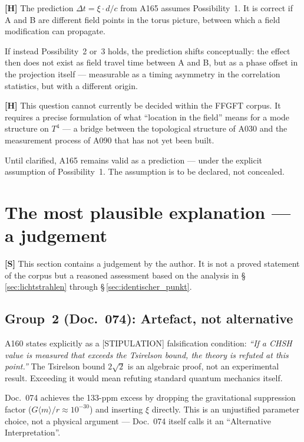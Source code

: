\textbf{[H]} The prediction $\Delta t = \xi \cdot d/c$ from A165
assumes Possibility~1. It is correct if A and B are different field
points in the torus picture, between which a field modification can
propagate.

If instead Possibility~2 or~3 holds, the prediction shifts
conceptually: the effect then does not exist as field travel time
between A and B, but as a phase offset in the projection itself ---
measurable as a timing asymmetry in the correlation statistics, but
with a different origin.

\textbf{[H]} This question cannot currently be decided within the
FFGFT corpus. It requires a precise formulation of what ``location
in the field'' means for a mode structure on $T^4$ --- a bridge
between the topological structure of A030 and the measurement process
of A090 that has not yet been built.

Until clarified, A165 remains valid as a prediction --- under the
explicit assumption of Possibility~1. The assumption is to be
declared, not concealed.

\section{The most plausible explanation --- a judgement}
\label{sec:urteil}

\textbf{[S]} This section contains a judgement by the author. It is not
a proved statement of the corpus but a reasoned assessment based on the
analysis in §\,\ref{sec:lichtstrahlen} through §\,\ref{sec:identischer_punkt}.

\subsection{Group~2 (Doc.~074): Artefact, not alternative}

A160 states explicitly as a [STIPULATION] falsification condition:
\emph{``If a CHSH value is measured that exceeds the Tsirelson bound,
the theory is refuted at this point.''} The Tsirelson bound $2\sqrt{2}$
is an algebraic proof, not an experimental result. Exceeding it would
mean refuting standard quantum mechanics itself.

Doc.~074 achieves the 133-ppm excess by dropping the gravitational
suppression factor ($G\langle m\rangle/r \approx 10^{-30}$) and
inserting $\xi$ directly. This is an unjustified parameter choice,
not a physical argument --- Doc.~074 itself calls it an
\enquote{Alternative Interpretation}.

